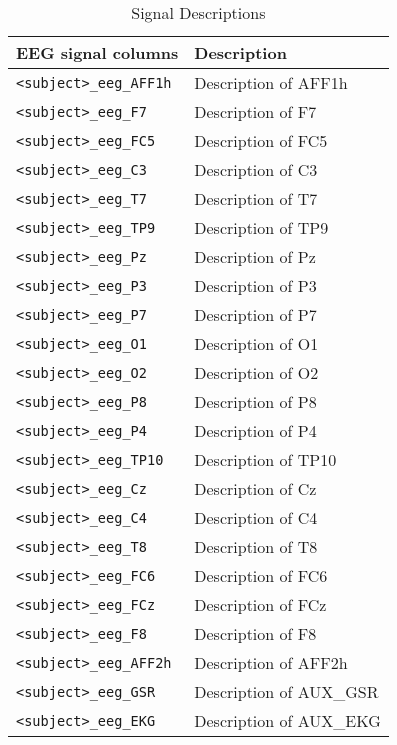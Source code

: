 \begin{table}
\centering
\begin{tabularx}{\textwidth}{|l|X|}
\hline
\textbf{EEG signal columns} & \textbf{Description} \\
\hline
\texttt{<subject>\_eeg\_AFF1h} & Description of AFF1h \\
\hline
\texttt{<subject>\_eeg\_F7} & Description of F7 \\
\hline
\texttt{<subject>\_eeg\_FC5} & Description of FC5 \\
\hline
\texttt{<subject>\_eeg\_C3} & Description of C3 \\
\hline
\texttt{<subject>\_eeg\_T7} & Description of T7 \\
\hline
\texttt{<subject>\_eeg\_TP9} & Description of TP9 \\
\hline
\texttt{<subject>\_eeg\_Pz} & Description of Pz \\
\hline
\texttt{<subject>\_eeg\_P3} & Description of P3 \\
\hline
\texttt{<subject>\_eeg\_P7} & Description of P7 \\
\hline
\texttt{<subject>\_eeg\_O1} & Description of O1 \\
\hline
\texttt{<subject>\_eeg\_O2} & Description of O2 \\
\hline
\texttt{<subject>\_eeg\_P8} & Description of P8 \\
\hline
\texttt{<subject>\_eeg\_P4} & Description of P4 \\
\hline
\texttt{<subject>\_eeg\_TP10} & Description of TP10 \\
\hline
\texttt{<subject>\_eeg\_Cz} & Description of Cz \\
\hline
\texttt{<subject>\_eeg\_C4} & Description of C4 \\
\hline
\texttt{<subject>\_eeg\_T8} & Description of T8 \\
\hline
\texttt{<subject>\_eeg\_FC6} & Description of FC6 \\
\hline
\texttt{<subject>\_eeg\_FCz} & Description of FCz \\
\hline
\texttt{<subject>\_eeg\_F8} & Description of F8 \\
\hline
\texttt{<subject>\_eeg\_AFF2h} & Description of AFF2h \\
\hline
\texttt{<subject>\_eeg\_GSR} & Description of AUX\_GSR \\
\hline
\texttt{<subject>\_eeg\_EKG} & Description of AUX\_EKG \\
\hline
\end{tabularx}
\caption{Signal Descriptions}
\label{tab:EEG_signals}
\end{table}

